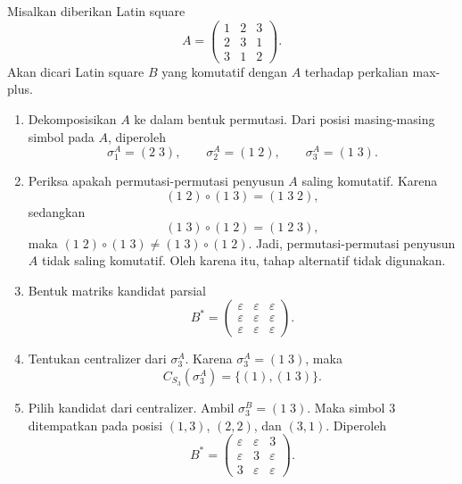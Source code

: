 \begin{contoh}\label{contoh:penerapan_algoritma_ordo_3_transposisi}
  Misalkan diberikan Latin square
  \[
    A=
    \begin{pmatrix}
      1 & 2 & 3 \\
      2 & 3 & 1 \\
      3 & 1 & 2
    \end{pmatrix}.
  \]
  Akan dicari Latin square $B$ yang komutatif dengan $A$ terhadap perkalian
  max-plus.

  \begin{enumerate}
    \item Dekomposisikan $A$ ke dalam bentuk permutasi. Dari posisi
          masing-masing simbol pada $A$, diperoleh
          \[
            \sigma_1^A=(2\;3),\qquad
            \sigma_2^A=(1\;2),\qquad
            \sigma_3^A=(1\;3).
          \]

    \item Periksa apakah permutasi-permutasi penyusun $A$ saling komutatif.
          Karena
          \[
            (1\;2)\circ(1\;3)=(1\;3\;2),
          \]
          sedangkan
          \[
            (1\;3)\circ(1\;2)=(1\;2\;3),
          \]
          maka $(1\;2)\circ(1\;3)\neq(1\;3)\circ(1\;2)$. Jadi,
          permutasi-permutasi penyusun $A$ tidak saling komutatif. Oleh
          karena itu, tahap alternatif tidak digunakan.

    \item Bentuk matriks kandidat parsial
          \[
            B^*=
            \begin{pmatrix}
              \varepsilon & \varepsilon & \varepsilon \\
              \varepsilon & \varepsilon & \varepsilon \\
              \varepsilon & \varepsilon & \varepsilon
            \end{pmatrix}.
          \]

    \item Tentukan centralizer dari $\sigma_3^A$. Karena
          $\sigma_3^A=(1\;3)$, maka
          \[
            C_{S_3}(\sigma_3^A)
            =
            \{(1),(1\;3)\}.
          \]

    \item Pilih kandidat dari centralizer. Ambil $\sigma_3^B=(1\;3)$.
          Maka simbol $3$ ditempatkan pada posisi $(1,3)$, $(2,2)$, dan
          $(3,1)$. Diperoleh
          \[
            B^*=
            \begin{pmatrix}
              \varepsilon & \varepsilon & 3           \\
              \varepsilon & 3           & \varepsilon \\
              3           & \varepsilon & \varepsilon
            \end{pmatrix}.
          \]


\end{enumerate}
\end{contoh}

